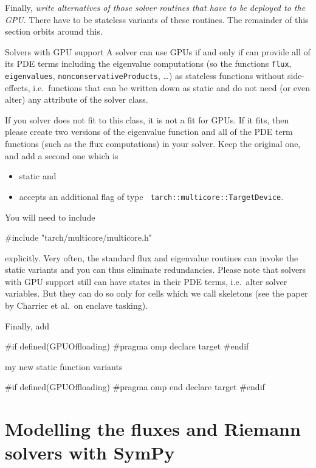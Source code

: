 Finally, \emph{write alternatives of those solver routines that have to be
deployed to the GPU}.
There have to be stateless variants of these routines.
The remainder of this section orbits around this.


\begin{definition}{Solvers with GPU support}
 A solver can use GPUs if and only if can provide all of its PDE terms
 including the eigenvalue computations (so the functions \texttt{flux},
 \texttt{eigenvalues}, \texttt{nonconservativeProducts}, \ldots) as stateless
 functions without side-effects, i.e.~functions that can be written down as
 static and do not need (or even alter) any attribute of the solver class.
\end{definition}

\noindent
If you solver does not fit to this class, it is not a fit for GPUs.
If it fits, then please create two versions of the eigenvalue function and all
of the PDE term functions (such as the flux computations) in your solver.
Keep the original one, and add a second one which is 

\begin{itemize}
  \item static and 
  \item accepts an additional flag of type \texttt{
  tarch::multicore::TargetDevice}.
\end{itemize}

\noindent
You will need to include 
\begin{code}
#include "tarch/multicore/multicore.h"
\end{code} 

\noindent
explicitly. Very often, the standard flux and eigenvalue routines can invoke the
static variants and you can thus eliminate redundancies.
Please note that solvers with GPU support still can have states in their PDE
terms, i.e.~alter solver variables.
But they can do so only for cells which we call skeletons (see the paper by
Charrier et al.~on enclave tasking).


Finally, add
\begin{code}
#if defined(GPUOffloading)
#pragma omp declare target
#endif

my new static function variants

#if defined(GPUOffloading)
#pragma omp end declare target
#endif
\end{code} 






\section{Modelling the fluxes and Riemann solvers with SymPy}

